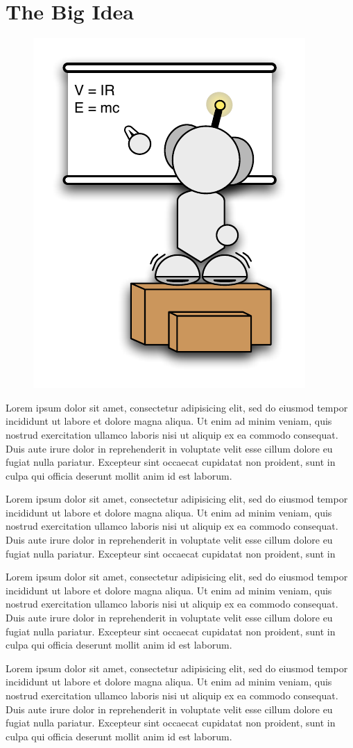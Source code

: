 \section{The Big Idea}

 \begin{figure}
		\includegraphics[width=0.24\columnwidth, trim=0mm 10mm 10mm 10mm]{diagrams/robot_whiteboard.pdf}
 \end{figure}

Lorem ipsum dolor sit amet, consectetur adipisicing elit, sed do
eiusmod tempor incididunt ut labore et dolore magna aliqua. Ut enim
ad minim veniam, quis nostrud exercitation ullamco laboris nisi ut
aliquip ex ea commodo consequat. Duis aute irure dolor in
reprehenderit in voluptate velit esse cillum dolore eu fugiat nulla
pariatur. Excepteur sint occaecat cupidatat non proident, sunt in
culpa qui officia deserunt mollit anim id est laborum.


Lorem ipsum dolor sit amet, consectetur adipisicing elit, sed do
eiusmod tempor incididunt ut labore et dolore magna aliqua. Ut enim
ad minim veniam, quis nostrud exercitation ullamco laboris nisi ut
aliquip ex ea commodo consequat. Duis aute irure dolor in
reprehenderit in voluptate velit esse cillum dolore eu fugiat nulla
pariatur. Excepteur sint occaecat cupidatat non proident, sunt in

Lorem ipsum dolor sit amet, consectetur adipisicing elit, sed do
eiusmod tempor incididunt ut labore et dolore magna aliqua. Ut enim
ad minim veniam, quis nostrud exercitation ullamco laboris nisi ut
aliquip ex ea commodo consequat. Duis aute irure dolor in
reprehenderit in voluptate velit esse cillum dolore eu fugiat nulla
pariatur. Excepteur sint occaecat cupidatat non proident, sunt in
culpa qui officia deserunt mollit anim id est laborum.

%

Lorem ipsum dolor sit amet, consectetur adipisicing elit, sed do
eiusmod tempor incididunt ut labore et dolore magna aliqua. Ut enim
ad minim veniam, quis nostrud exercitation ullamco laboris nisi ut
aliquip ex ea commodo consequat. Duis aute irure dolor in
reprehenderit in voluptate velit esse cillum dolore eu fugiat nulla
pariatur. Excepteur sint occaecat cupidatat non proident, sunt in
culpa qui officia deserunt mollit anim id est laborum.



